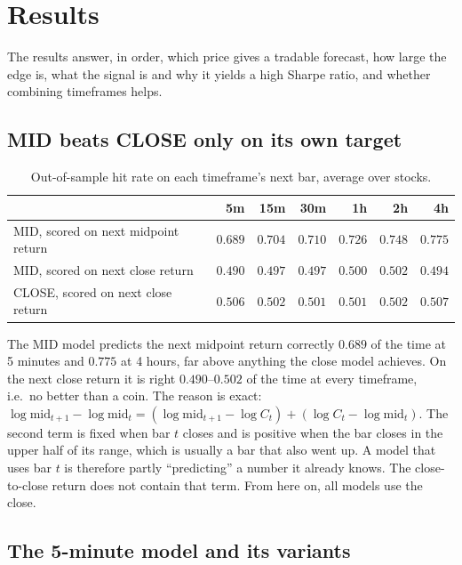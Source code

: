 \documentclass[11pt,a4paper]{article}
\begin{document}
\section{Results}
\label{sec:results}

The results answer, in order, which price gives a tradable forecast, how large the edge is, what the signal is and why it yields a high Sharpe ratio, and whether combining timeframes helps.


\subsection{MID beats CLOSE only on its own target}
\label{sec:mid}

\begin{table}[htbp]
\centering
\caption{Out-of-sample hit rate on each timeframe's next bar, average over stocks.}
\label{tab:midacc}
\small
\begin{tabular}{@{}lrrrrrr@{}}
\toprule
& 5m & 15m & 30m & 1h & 2h & 4h \\
\midrule
MID, scored on next midpoint return & $0.689$ & $0.704$ & $0.710$ & $0.726$ & $0.748$ & $0.775$ \\
MID, scored on next close return & $0.490$ & $0.497$ & $0.497$ & $0.500$ & $0.502$ & $0.494$ \\
CLOSE, scored on next close return & $0.506$ & $0.502$ & $0.501$ & $0.501$ & $0.502$ & $0.507$ \\
\bottomrule
\end{tabular}
\end{table}

The MID model predicts the next midpoint return correctly $0.689$ of the time at 5 minutes and
$0.775$ at 4 hours, far above anything the close model achieves. On the next close return it is
right $0.490$--$0.502$ of the time at every timeframe, i.e.\ no better than a coin. The reason
is exact: $\log\mathrm{mid}_{t+1}-\log\mathrm{mid}_t = (\log\mathrm{mid}_{t+1}-\log C_t) +
(\log C_t-\log\mathrm{mid}_t)$. The second term is fixed when bar $t$ closes and is positive when the bar
closes in the upper half of its range, which is usually a bar that also went up. A model that uses bar
$t$ is therefore partly ``predicting'' a number it already knows. The close-to-close return does not
contain that term. From here on, all models use the close.

\subsection{The 5-minute model and its variants}
\label{sec:close}
\end{document}
